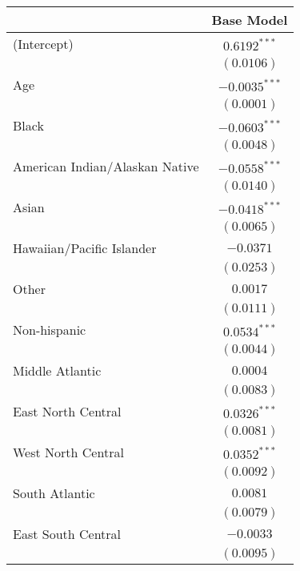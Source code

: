 
\begin{table}
\begin{center}
\begin{tabular}{l c}
\hline
 & Base Model \\
\hline
(Intercept)                    & $0.6192^{***}$  \\
                               & $(0.0106)$      \\
Age                            & $-0.0035^{***}$ \\
                               & $(0.0001)$      \\
Black                          & $-0.0603^{***}$ \\
                               & $(0.0048)$      \\
American Indian/Alaskan Native & $-0.0558^{***}$ \\
                               & $(0.0140)$      \\
Asian                          & $-0.0418^{***}$ \\
                               & $(0.0065)$      \\
Hawaiian/Pacific Islander      & $-0.0371$       \\
                               & $(0.0253)$      \\
Other                          & $0.0017$        \\
                               & $(0.0111)$      \\
Non-hispanic                   & $0.0534^{***}$  \\
                               & $(0.0044)$      \\
Middle Atlantic                & $0.0004$        \\
                               & $(0.0083)$      \\
East North Central             & $0.0326^{***}$  \\
                               & $(0.0081)$      \\
West North Central             & $0.0352^{***}$  \\
                               & $(0.0092)$      \\
South Atlantic                 & $0.0081$        \\
                               & $(0.0079)$      \\
East South Central             & $-0.0033$       \\
                               & $(0.0095)$      \\

\end{tabular}
\end{center}
\end{table}

